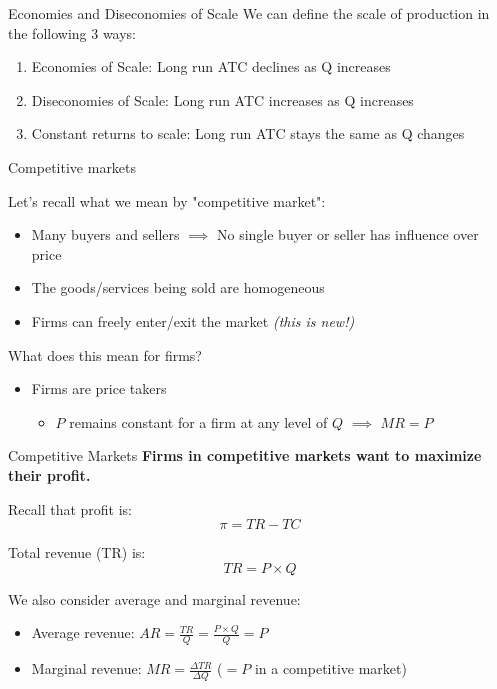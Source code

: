 \documentclass[compress]{beamer}
\begin{document}
\begin{frame}{Economies and Diseconomies of Scale}
    We can define the scale of production in the following 3 ways:
    \begin{enumerate}
        \item Economies of Scale: Long run ATC declines as Q increases
        \item Diseconomies of Scale: Long run ATC increases as Q increases
        \item Constant returns to scale: Long run ATC stays the same as Q changes
    \end{enumerate}
\end{frame}




\begin{frame}{Competitive markets}
    \begin{block}{Let's recall what we mean by "competitive market":}
        \begin{itemize}
            \item Many buyers and sellers $\implies$ No single buyer or seller has influence over price
            \item The goods/services being sold are homogeneous
            \item Firms can freely enter/exit the market \textit{(this is new!)}
        \end{itemize}
    \end{block}
    \begin{block}{What does this mean for firms?}
        \begin{itemize}
            \item Firms are price takers
            \begin{itemize}
                \item $P$ remains constant for a firm at any level of $Q$ $\implies$ $MR = P$
            \end{itemize}
        \end{itemize}
    \end{block}
\end{frame}

\begin{frame}{Competitive Markets}
\textbf{    Firms in competitive markets want to maximize their profit.
}
    \vspace{5mm}

    Recall that profit is:
    \[\pi = TR - TC\]
    
    Total revenue (TR) is:
    \[TR = P\times Q\]

    \begin{block}{We also consider average and marginal revenue:}
        \begin{itemize}
            \item Average revenue: \(AR = \frac{TR}{Q} = \frac{P\times Q}{Q} = P\)
            \item Marginal revenue: \(MR = \frac{\Delta TR}{\Delta Q}\) \quad ($=P$ in a competitive market)
        \end{itemize}
    \end{block}
\end{frame}
\end{document}
